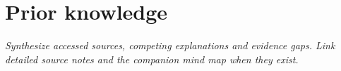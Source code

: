 \section{Prior knowledge}
\label{sec:prior}
\emph{Synthesize accessed sources, competing explanations and evidence gaps.
Link detailed source notes and the companion mind map when they exist.}
